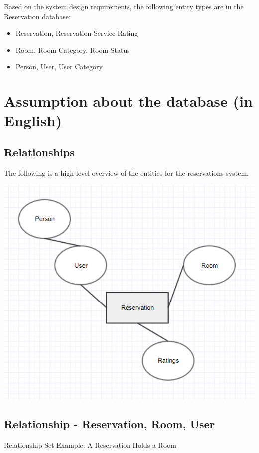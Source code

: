 \documentclass[11pt]{report}
\begin{document}
Based on the system design requirements, the following entity types are in the Reservation database:
\begin{itemize}
    \item Reservation,  Reservation Service Rating
    \item Room, Room Category, Room Status
    \item Person, User, User Category
\end{itemize}

\section*{Assumption about the database (in English)}
\subsection*{Relationships}
The following is a high level overview of the entities for the reservations system.  

\begin{center}
\includegraphics{reservation_conceptual.PNG}
\end{center}
\pagebreak

\subsection*{Relationship - Reservation, Room, User}
Relationship Set Example: A Reservation  Holds a Room
\end{document}
